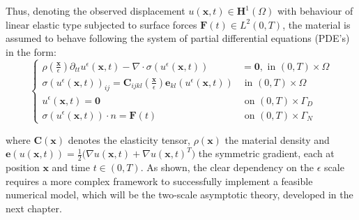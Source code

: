 Thus, denoting the observed displacement $u(\mathbf{x},t) \in \mathbf{H}^1(\Omega)$ with behaviour of linear elastic type subjected to surface forces $\mathbf{F}(t) \in L^2 (0, T)$, the material is assumed to behave following the system of partial differential equations (PDE's) in the form:
\begin{equation*}
    \left \{
    \begin{aligned}
        \rho (\frac{\mathbf{x}}{\epsilon}) \partial_{tt} u^{\epsilon}(\mathbf{x},t) - \nabla \cdot \sigma (u^{\epsilon}(\mathbf{x},t)) & = \mathbf{0}, \text{ in } (0,T)\times \Omega \\
        \sigma(u^{\epsilon}(\mathbf{x},t))_{ij} = \mathbf{C}_{ijkl}(\frac{\mathbf{x}}{\epsilon}) \mathbf{e}_{kl}(u^{\epsilon}(\mathbf{x},t)) & \text{ in } (0,T)\times \Omega \\
        u^{\epsilon}(\mathbf{x},t) = \mathbf{0} & \text{ on } (0,T)\times \Gamma_D\\
        \sigma(u^{\epsilon}(\mathbf{x},t)) \cdot n = \mathbf{F}(t) & \text{ on } (0,T)\times \Gamma_N
    \end{aligned}
    \right .
\end{equation*}

where $\mathbf{C}(\mathbf{x})$ denotes the elasticity tensor, $\rho(\mathbf{x})$ the material density and $\mathbf{e}(u(\mathbf{x},t)) = \frac{1}{2}\big( \nabla u(\mathbf{x},t) + \nabla u(\mathbf{x},t)^{T}\big)$ the symmetric gradient, each at position $\mathbf{x}$ and time $t \in (0,T)$. As shown, the clear dependency on the $\epsilon$ scale requires a more complex framework to successfully implement a feasible numerical model, which will be the two-scale asymptotic theory, developed in the next chapter.


